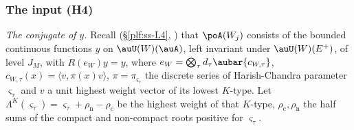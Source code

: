 \documentclass[10pt]{amsart}
\theoremstyle{definition}
\theoremstyle{remark}
\begin{document}
\subsubsection{The input (H4)}\label{psv:ss-H4}

\emph{The conjugate of $y$.} Recall (\S\ref{plf:ss-L4}, {\cite[Definition~8.1]{P49}}) that $\poA(W_j)$ consists
of the bounded continuous functions $y$ on $\auU(W)(\auA)$, left invariant under $\auU(W)(E^+)$, of level $J_M$,
with $R(e_W)y=y$, where $e_W=\bigotimes_\tau d_\tau\aubar{c_{W,\tau}}$, $c_{W,\tau}(x)=\langle v,\pi(x)v\rangle$, $\pi=\pi_{\varsigma_\tau}$
the discrete series of Harish-Chandra parameter $\varsigma_\tau$ and $v$ a unit highest weight vector of its lowest
$K$-type. Let $\Lambda^K(\varsigma_\tau)=\varsigma_\tau+\rho_{\mathrm n}-\rho_{\mathrm c}$ be the highest weight of that $K$-type,
$\rho_{\mathrm c},\rho_{\mathrm n}$ the half sums of the compact and non-compact roots positive for $\varsigma_\tau$.
\end{document}
